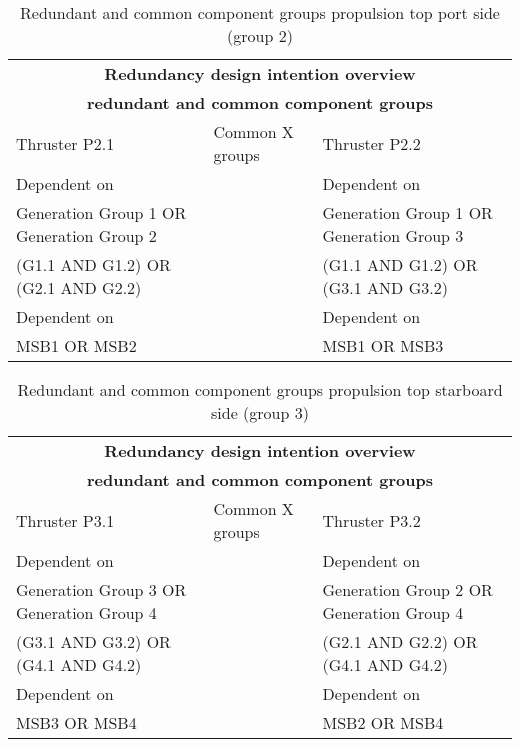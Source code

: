 \begin{table}[h]
    \centering
    \begin{tabular}{|m{5.6cm}|m{2.5cm}|m{5.6cm}|}
    \hline
    \multicolumn{3}{|c|}{\textbf{Redundancy design intention overview}} \\
    \multicolumn{3}{|c|}{\textbf{redundant and common component groups}} \\
    \hline
    Thruster P2.1 & Common X groups & Thruster P2.2 \\
    \hline
    Dependent on & & Dependent on \\
    \hline
    Generation Group 1 OR Generation Group 2 & & Generation Group 1 OR Generation Group 3 \\
    \hline
    (G1.1 AND G1.2) OR (G2.1 AND G2.2) & & (G1.1 AND G1.2) OR (G3.1 AND G3.2) \\
    \hline
    Dependent on & & Dependent on \\
    \hline
    MSB1 OR MSB2 & & MSB1 OR MSB3 \\
    \hline

    \end{tabular}
    \caption{Redundant and common component groups propulsion top port side (group 2)}
    \label{tab:RedundantComponentGroupsThrusters2}
\end{table}

\begin{table}[h]
    \centering
    \begin{tabular}{|m{5.6cm}|m{2.5cm}|m{5.6cm}|}
    \hline
    \multicolumn{3}{|c|}{\textbf{Redundancy design intention overview}} \\
    \multicolumn{3}{|c|}{\textbf{redundant and common component groups}} \\
    \hline
    Thruster P3.1 & Common X groups & Thruster P3.2 \\
    \hline
    Dependent on & & Dependent on \\
    \hline
    Generation Group 3 OR Generation Group 4 & & Generation Group 2 OR Generation Group 4 \\
    \hline
    (G3.1 AND G3.2) OR (G4.1 AND G4.2) & & (G2.1 AND G2.2) OR (G4.1 AND G4.2) \\
    \hline
    Dependent on & & Dependent on \\
    \hline
    MSB3 OR MSB4 & & MSB2 OR MSB4 \\    
    \hline
    \end{tabular}
    \caption{Redundant and common component groups propulsion top starboard side (group 3)}
    \label{tab:RedundantComponentGroupsThrusters3}
\end{table}

